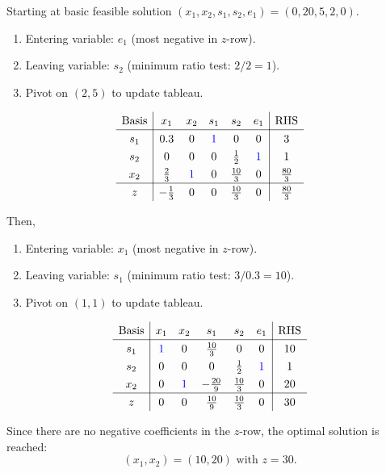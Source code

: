 \documentclass[a4paper, 10pt]{article}
\begin{document}
\begin{tosubmit}
Starting at basic feasible solution \( (x_1, x_2, s_1, s_2, e_1) = (0, 20, 5, 2, 0) \).
\begin{enumerate}
    \item Entering variable: \( e_1 \) (most negative in \( z \)-row).
    \item Leaving variable: \( s_2 \) (minimum ratio test: \( 2/2 = 1 \)).
    \item Pivot on \( (2,5) \) to update tableau.
\end{enumerate}
\[
\renewcommand{\arraystretch}{1.3}
\begin{array}{c|ccccc|c}
    \text{Basis} & x_1 & x_2 & s_1 & s_2 & e_1 & \text{RHS} \\
    \hline
    s_1 & 0.3 & 0 & \textcolor[HTML]{0000FF}{1} & 0 & 0 & 3 \\
    s_2 & 0 & 0 & 0 & \frac{1}{2} & \textcolor[HTML]{0000FF}{1} & 1 \\
    x_2 & \frac{2}{3} & \textcolor[HTML]{0000FF}{1} & 0 & \frac{10}{3} & 0 & \frac{80}{3} \\
    \hline
    z & -\frac{1}{3} & 0 & 0 & \frac{10}{3} & 0 & \frac{80}{3} \\
\end{array}
\]

\newpage

Then,
\begin{enumerate}
    \item Entering variable: \( x_1 \) (most negative in \( z \)-row).
    \item Leaving variable: \( s_1 \) (minimum ratio test: \( 3/0.3 = 10 \)).
    \item Pivot on \( (1,1) \) to update tableau.
\end{enumerate}
\[
\renewcommand{\arraystretch}{1.3}
\begin{array}{c|ccccc|c}
    \text{Basis} & x_1 & x_2 & s_1 & s_2 & e_1 & \text{RHS} \\
    \hline
    s_1 & \textcolor[HTML]{0000FF}{1} & 0 & \frac{10}{3} & 0 & 0 & 10 \\
    s_2 & 0 & 0 & 0 & \frac{1}{2} & \textcolor[HTML]{0000FF}{1} & 1 \\
    x_2 & 0 & \textcolor[HTML]{0000FF}{1} & -\frac{20}{9} & \frac{10}{3} & 0 & 20 \\
    \hline
    z & 0 & 0 & \frac{10}{9} & \frac{10}{3} & 0 & 30 \\
\end{array}
\]

Since there are no negative coefficients in the \( z \)-row, the optimal solution is reached:
\[ \boxed{(x_1, x_2) = (10, 20) \text{ with } z = 30}. \]
\end{tosubmit}
\end{document}
